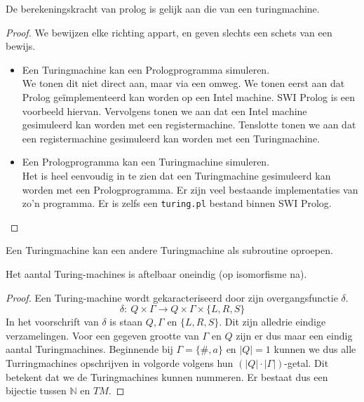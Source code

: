 \documentclass[main.tex]{subfiles}
\begin{document}
\begin{st}
  De berekeningskracht van prolog is gelijk aan die van een turingmachine.

  \begin{proof}
    We bewijzen elke richting appart, en geven slechts een schets van een bewijs.
    \begin{itemize}
    \item Een Turingmachine kan een Prologprogramma simuleren.\\
      We tonen dit niet direct aan, maar via een omweg.
      We tonen eerst aan dat Prolog ge\"implementeerd kan worden op een Intel machine.
      SWI Prolog is een voorbeeld hiervan.
      Vervolgens tonen we aan dat een Intel machine gesimuleerd kan worden met een registermachine.
      Tenslotte tonen we aan dat een registermachine gesimuleerd kan worden met een Turingmachine.
    \item Een Prologprogramma kan een Turingmachine simuleren.\\
      Het is heel eenvoudig in te zien dat een Turingmachine gesimuleerd kan worden met een Prologprogramma.
      Er zijn veel bestaande implementaties van zo'n programma.
      Er is zelfs een \verb|turing.pl| bestand binnen SWI Prolog.\cite{prolog-tm}
    \end{itemize}
  \end{proof}
\end{st}

\begin{de}
  Een Turingmachine kan een andere Turingmachine als subroutine oproepen.
\end{de}

\begin{st}
  Het aantal Turing-machines is aftelbaar oneindig (op isomorfisme na).

  \begin{proof}
    Een Turing-machine wordt gekaracteriseerd door zijn overgangsfunctie $\delta$.
    \[ \delta:\ Q \times \Gamma \rightarrow Q \times \Gamma \times \{L,R,S\} \]
    In het voorschrift van $\delta$ is staan $Q,\Gamma$ en $\{L,R,S\}$. 
    Dit zijn alledrie eindige verzamelingen. 
    Voor een gegeven grootte van $\Gamma$ en $Q$ zijn er dus maar een eindig aantal Turingmachines.
    Beginnende bij $\Gamma = \{\#,a\}$ en $|Q|=1$ kunnen we dus alle Turringmachines opschrijven in volgorde volgens hun $(|Q|\cdot|\Gamma|)$-getal.
    Dit betekent dat we de Turingmachines kunnen nummeren.
    Er bestaat dus een bijectie tussen $\mathbb{N}$ en $TM$.
  \end{proof}
\end{st}
\end{document}
